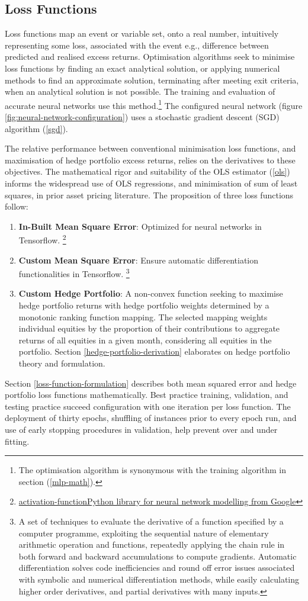 \documentclass[12pt]{article}
\begin{document}
\subsection{Loss Functions}
Loss functions map an event or variable set, onto a real number, intuitively representing some loss, associated with the event e.g., difference between predicted and realised excess returns.
Optimisation algorithms seek to minimise loss functions by finding an exact analytical solution, or applying numerical methods to find an approximate solution, terminating after meeting exit criteria, when an analytical solution is not possible.
The training and evaluation of accurate neural networks use this method.\footnote{The optimisation algorithm is synonymous with the training algorithm in section (\ref{mlp-math}).}
The configured neural network (figure \ref{fig:neural-network-configuration}) uses a stochastic gradient descent (SGD) algorithm (\ref{sgd}).

The relative performance between conventional minimisation loss functions, and maximisation of hedge portfolio excess returns, relies on the derivatives to these objectives.
The mathematical rigor and suitability of the OLS estimator (\ref{ols}) informs the widespread use of OLS regressions, and minimisation of sum of least squares, in prior asset pricing literature.
The proposition of three loss functions follow:
\singlespacing
\begin{enumerate}
	\item \textbf{In-Built Mean Square Error}: Optimized for neural networks in Tensorflow. \footnote{\href{https://www.tensorflow.org/}{activation-functionPython library for neural network modelling from Google}}
	\item \textbf{Custom Mean Square Error}: Ensure automatic differentiation functionalities in Tensorflow.
	\footnote{A set of techniques to evaluate the derivative of a function specified by a computer programme,
	exploiting the sequential nature of elementary arithmetic operation and functions, repeatedly applying the chain rule in both forward and backward accumulations to compute gradients.
	Automatic differentiation solves code inefficiencies and round off error issues associated with symbolic and numerical differentiation methods, while easily calculating higher order derivatives, and partial derivatives with many inputs.}
	\item \textbf{Custom Hedge Portfolio}: A non-convex function seeking to maximise hedge portfolio returns with hedge portfolio weights determined by a monotonic ranking function mapping.
	The selected mapping weights individual equities by the proportion of their contributions to aggregate returns of all equities in a given month, considering all equities in the portfolio.
	Section \ref{hedge-portfolio-derivation} elaborates on hedge portfolio theory and formulation.
\end{enumerate}
Section \ref{loss-function-formulation} describes both mean squared error and hedge portfolio loss functions mathematically.
Best practice training, validation, and testing practice succeed configuration with one iteration per loss function.
The deployment of thirty epochs, shuffling of instances prior to every epoch run, and use of early stopping procedures in validation, help prevent over and under fitting.
\end{document}
